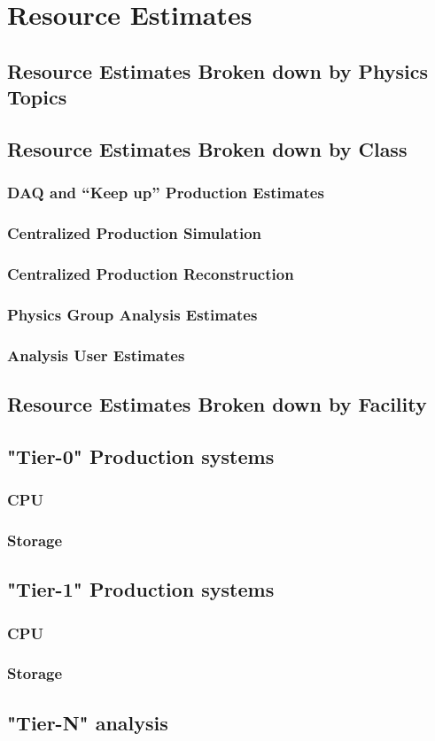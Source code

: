 
%
\chapter{Resource Estimates} 
\section{Resource Estimates Broken down by Physics Topics}
\section{Resource Estimates Broken down by Class}
\subsection{DAQ and ``Keep up'' Production Estimates}
\subsection{Centralized Production Simulation}
\subsection{Centralized Production Reconstruction}
\subsection{Physics Group Analysis Estimates}
\subsection{Analysis User Estimates}
\section{Resource Estimates Broken down by Facility}
\section{"Tier-0" Production systems}
\subsection{CPU}
\subsection{Storage}
\section{"Tier-1" Production systems}
\subsection{CPU}
\subsection{Storage}
\section{"Tier-N" analysis}

